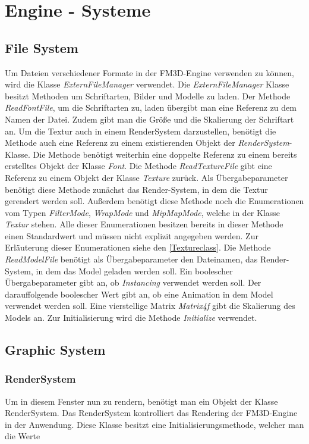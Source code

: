 \section{Engine - Systeme}


\subsection{File System}
Um Dateien verschiedener Formate in der FM3D-Engine verwenden zu können, wird die Klasse \textit{ExternFileManager} verwendet.
Die \textit{ExternFileManager} Klasse besitzt Methoden um Schriftarten, Bilder und Modelle zu laden. Der Methode \textit{ReadFontFile}, um die Schriftarten zu, laden übergibt man eine Referenz zu dem Namen der Datei. Zudem gibt man die Größe und die Skalierung der Schriftart an. Um die Textur auch in einem RenderSystem darzustellen, benötigt die Methode auch eine Referenz zu einem existierenden Objekt der \textit{RenderSystem}-Klasse. Die Methode benötigt weiterhin eine doppelte Referenz zu einem bereits erstelltes Objekt der Klasse \textit{Font}. 
Die Methode \textit{ReadTextureFile} gibt eine Referenz zu einem Objekt der Klasse \textit{Texture} zurück. Als Übergabeparameter benötigt diese Methode zunächst das Render-System, in dem die Textur gerendert werden soll. Außerdem benötigt diese Methode noch  die Enumerationen vom Typen \textit{FilterMode}, \textit{WrapMode} und \textit{MipMapMode}, welche in der Klasse \textit{Textur} stehen. Alle dieser Enumerationen besitzen bereits in dieser Methode einen Standardwert und müssen nicht explizit angegeben werden. Zur Erläuterung dieser Enumerationen siehe den \cref{Textureclass}. 
Die Methode \textit{ReadModelFile} benötigt als Übergabeparameter den Dateinamen, das Render-System, in dem das Model geladen werden soll. Ein boolescher Übergabeparameter gibt an, ob \textit{Instancing} verwendet werden soll. Der darauffolgende boolescher Wert gibt an, ob eine Animation in dem Model verwendet werden soll. Eine vierstellige Matrix \textit{Matrix4f} gibt die Skalierung des Models an.
Zur Initialisierung wird die Methode \textit{Initialize} verwendet.

\subsection{Graphic System}

\subsubsection{RenderSystem}
Um in diesem Fenster nun zu rendern, benötigt man ein Objekt der Klasse RenderSystem. Das RenderSystem kontrolliert das Rendering der FM3D-Engine in der Anwendung. Diese Klasse besitzt eine Initialisierungsmethode, welcher man die Werte 

